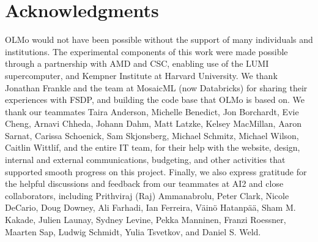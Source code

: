 \documentclass[11pt]{article}
\newcommand{\olmo}{OLMo\xspace}
\begin{document}
\section*{Acknowledgments}
 \label{sec:ack}
 \olmo would not have been possible without the support of many individuals and institutions.
 The experimental components of this work were made possible through a partnership with AMD and CSC, enabling use of the LUMI supercomputer, and Kempner Institute at Harvard University.
 We thank Jonathan Frankle and the team at MosaicML (now Databricks) for sharing their experiences with FSDP, and building the code base that OLMo is based on.
 We thank our teammates Taira Anderson, Michelle Benedict, Jon Borchardt, Evie Cheng, Arnavi Chheda, Johann Dahm, Matt Latzke, Kelsey MacMillan, Aaron Sarnat, Carissa Schoenick, Sam Skjonsberg, Michael Schmitz, Michael Wilson, Caitlin Wittlif, and the entire IT team, for their help with the website, design, internal and external communications, budgeting, and other activities that supported smooth progress on this project.
 Finally, we also express gratitude for the helpful discussions and feedback from our teammates at AI2 and close collaborators, including Prithviraj (Raj) Ammanabrolu, Peter Clark, Nicole DeCario, Doug Downey, Ali Farhadi, Ian Ferreira, Väinö Hatanpää, Sham M. Kakade, Julien Launay, Sydney Levine, Pekka Manninen, Franzi Roessner, Maarten Sap, Ludwig Schmidt, Yulia Tsvetkov, and Daniel S. Weld.






\newpage
\appendix


\end{document}
